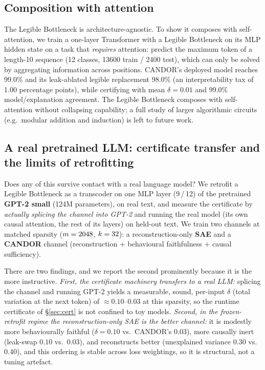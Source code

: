 \documentclass[11pt]{article}
\providecommand{\seqLen}{10}\providecommand{\seqVocab}{12}\providecommand{\seqClasses}{12}
\providecommand{\seqAccFull}{99.0}\providecommand{\seqAccLegible}{98.0}\providecommand{\seqTaxPct}{1.00}
\providecommand{\seqDelta}{0.01}\providecommand{\seqAgree}{99.0}\providecommand{\seqTrain}{13600}\providecommand{\seqTest}{2400}
\providecommand{\gptParams}{124}\providecommand{\gptLayer}{9}\providecommand{\gptNLayer}{12}
\providecommand{\gptSaeDelta}{0.10}\providecommand{\gptCandorDelta}{0.03}\providecommand{\gptSaeSwap}{0.10}\providecommand{\gptCandorSwap}{0.03}
\providecommand{\gptSaeRecon}{0.30}\providecommand{\gptCandorRecon}{0.40}\providecommand{\gptSaeRecovered}{70.0}\providecommand{\gptCandorRecovered}{90.0}
\begin{document}
\subsection{Composition with attention}
\label{sec:seq}
The Legible Bottleneck is architecture-agnostic. To show it composes with
self-attention, we train a one-layer Transformer with a Legible Bottleneck on its MLP
hidden state on a task that \emph{requires} attention: predict the maximum token of a
length-\seqLen{} sequence (\seqClasses{} classes, \seqTrain{} train / \seqTest{} test),
which can only be solved by aggregating information across positions. CANDOR's deployed
model reaches \seqAccFull\% and its leak-ablated legible replacement \seqAccLegible\%
(an interpretability tax of \seqTaxPct{} percentage points), while certifying with mean
$\delta=\seqDelta{}$ and \seqAgree\% model/explanation agreement. The Legible Bottleneck
composes with self-attention without collapsing capability; a full study of larger
algorithmic circuits (e.g.\ modular addition and induction) is left to future work.

\subsection{A real pretrained LLM: certificate transfer and the limits of retrofitting}
\label{sec:gpt2}
Does any of this survive contact with a real language model? We retrofit a Legible
Bottleneck as a transcoder on one MLP layer (\gptLayer{}\,/\,\gptNLayer{}) of the
pretrained \textbf{GPT-2 small} (\gptParams{}M parameters), on real text, and measure the
certificate by \emph{actually splicing the channel into GPT-2} and running the real model
(its own causal attention, the rest of its layers) on held-out text. We train two channels
at matched sparsity ($m=2048$, $k=32$): a reconstruction-only \textbf{SAE} and a
\textbf{CANDOR} channel (reconstruction $+$ behavioural faithfulness $+$ causal sufficiency).

There are two findings, and we report the second prominently because it is the more
instructive. \emph{First, the certificate machinery transfers to a real LLM:} splicing the
channel and running GPT-2 yields a measurable, sound, per-input $\delta$ (total variation at
the next token) of $\approx\gptSaeDelta{}$--$\gptCandorDelta{}$ at this sparsity, so the
runtime certificate of \S\ref{sec:cert} is
not confined to toy models. \emph{Second, in the frozen-retrofit regime the
reconstruction-only SAE is the better channel:} it is modestly more behaviourally faithful
($\delta=\gptSaeDelta$ vs.\ CANDOR's $\gptCandorDelta$), more causally inert (leak-swap
$\gptSaeSwap$ vs.\ $\gptCandorSwap$), and reconstructs better (unexplained variance
$\gptSaeRecon$ vs.\ $\gptCandorRecon$), and this ordering is stable across loss
weightings, so it is structural, not a tuning artefact.
\end{document}
